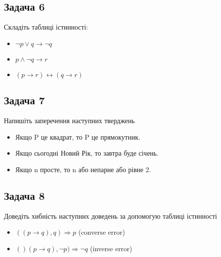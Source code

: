 \documentclass{article}
\begin{document}
\subsection*{Задача 6}
Складіть таблиці істинності:
\begin{itemize}
    \item $\lnot p \lor q \rightarrow \lnot q$
    \item $p \land \lnot q \rightarrow r $
    \item $(p \rightarrow r) \leftrightarrow (q \rightarrow r)$
\end{itemize}


\subsection*{Задача 7}
Напишіть заперечення наступних тверджень
\begin{itemize}
    \item Якщо P це квадрат, то P це прямокутник.
    \item Якщо сьогодні Новий Рік, то завтра буде січень.
    \item Якщо n просте, то n або непарне або рівне 2.
\end{itemize}

\subsection*{Задача 8}
Доведіть хибність наступних доведень за допомогую таблиці істинності
\begin{itemize}
    \item $((p \rightarrow q), q) \Rightarrow p$ (converse error)
    \item $()(p \rightarrow q), \lnot p) \Rightarrow \lnot q$ (inverse error)
\end{itemize}
\end{document}
